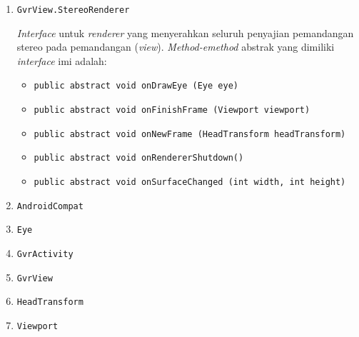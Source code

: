	\begin{enumerate}
		\item \texttt{GvrView.StereoRenderer}
		
		\textit{Interface} untuk \textit{renderer} yang menyerahkan seluruh penyajian pemandangan stereo pada pemandangan (\textit{view}). \textit{Method-emethod} abstrak yang dimiliki \textit{interface} imi adalah:
			\begin{itemize}
				\item \texttt{public abstract void onDrawEye (Eye eye)}
				
				
				
				\item \texttt{public abstract void onFinishFrame (Viewport viewport)}
				\item \texttt{public abstract void onNewFrame (HeadTransform headTransform)}
				\item \texttt{public abstract void onRendererShutdown()}
				
				\item \texttt{public abstract void onSurfaceChanged (int width, int height)}
			\end{itemize}					
		
		\item \texttt{AndroidCompat}
		
		\item \texttt{Eye}
		
		\item \texttt{GvrActivity}
		
		\item \texttt{GvrView}
		
		\item \texttt{HeadTransform}
		
		\item \texttt{Viewport}
	
	\end{enumerate}

